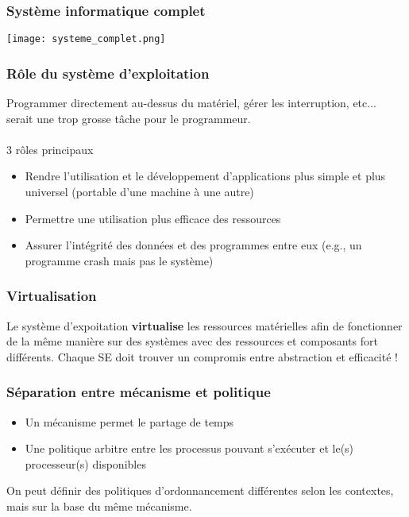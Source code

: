 \documentclass{article}
\begin{document}
        \subsubsection{Système informatique complet}
            \texttt{[image: systeme\_complet.png]}
        
        \subsubsection{Rôle du système d'exploitation}
            Programmer directement au-dessus du matériel, gérer les interruption, etc... serait une trop grosse tâche pour le programmeur.\\\\
            3 rôles principaux
            \begin{itemize}
                \item Rendre l’utilisation et le développement d’applications
                plus simple et plus universel (portable d’une machine à
                une autre)
                \item Permettre une utilisation plus efficace des ressources
                \item Assurer l’intégrité des données et des programmes
                entre eux (e.g., un programme crash mais pas le système)
            \end{itemize}
        
        \subsubsection{Virtualisation}
            Le système d'expoitation \textbf{virtualise} les ressources matérielles afin de fonctionner de la même manière sur des systèmes avec des ressources et composants fort différents.
            Chaque SE doit trouver un compromis entre abstraction et efficacité !

        \subsubsection{Séparation entre mécanisme et politique}
            \begin{itemize}
                \item Un mécanisme permet le partage de temps
                \item Une politique arbitre entre les processus pouvant s’exécuter
                et le(s) processeur(s) disponibles
            \end{itemize}
            On peut définir des politiques d’ordonnancement différentes selon les contextes, mais sur la base du même mécanisme.
        
\end{document}
